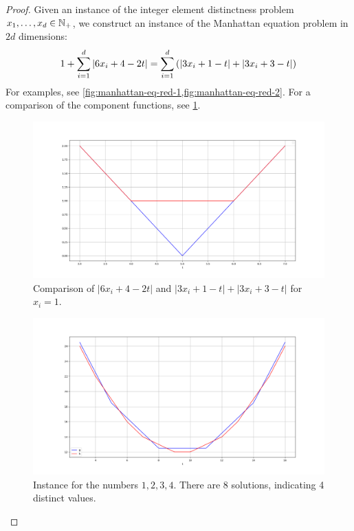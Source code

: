 \begin{proof}
	Given an instance of the integer element distinctness problem \(x_1, \dots, x_d \in \mathbb{N}_+\), we construct an instance of the Manhattan equation problem in \(2d\) dimensions:
	\begin{equation}\label{eq:red-eq-manhattan}
		1 + \sum_{i=1}^d |6x_i + 4 - 2t| = \sum_{i=1}^d \left(|3x_i + 1 - t| + |3x_i + 3 - t|\right)
	\end{equation}
	For examples, see \cref{fig:manhattan-eq-red-1,fig:manhattan-eq-red-2}. For a comparison of the component functions, see \cref{fig:manhattan-building-block}.

	\begin{figure}
	  \centering
	  \includegraphics[scale=1, width=0.9\linewidth]{figures/manhattan-building-block.png}
	  \caption{Comparison of \(|6x_i + 4 - 2t|\) and \(|3x_i + 1 - t| + |3x_i + 3 - t|\) for \(x_i = 1\).}
	  \label{fig:manhattan-building-block}
	\end{figure}

	\begin{figure}
	  \centering
	  \includegraphics[scale=1, width=0.9\linewidth]{figures/manhattan-eq-red-1.png}
	  \caption{Instance for the numbers \(1,2,3,4\). There are 8 solutions, indicating 4 distinct values.}
	  \label{fig:manhattan-eq-red-1}
	\end{figure}


\end{proof}
